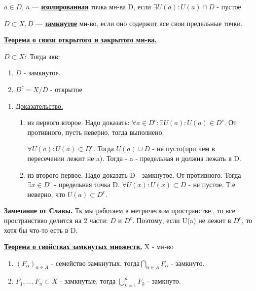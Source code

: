 \documentclass{article}
\newcommand{\deff}[1]{\underline{\textbf{#1}}}
\newcommand{\thmm}[1]{\underline{\textbf{#1}}}
\begin{document}
$a \in D$, $a$ --- \deff{изолированная} точка мн-ва D, если $\exists U(a): U(a) \cap D$ - пустое

$D \subset X, D$ --- \deff{замкнутое} мн-во, если оно содержит все свои предельные точки.

\thmm{Теорема о связи открытого и закрытого мн-ва.}

$D \subset X:$ Тогда экв:

\begin{enumerate}
    \item $D$ - замкнутое.
    \item $D^c =X/D$ - открытое
\end{enumerate}
\begin{enumerate}
        \item[] \uline{Доказательство.}

        \begin{enumerate}
            \item из первого второе. Надо доказать: $\forall a \in D^c:  \exists U(a): U(a) \in D^c$. От противного, пусть неверно, тогда выполнено:

            $\forall U(a): U(a) \subset D^c$. Тогда $U(a) \cup D$ - не пусто(при чем в пересечении лежит не a). Тогда - a - предельная и должна лежать в D.

            \item  из второго первое. Надо доказать D - замкнутое. От противного. Тогда $\exists x\in D^c$ - предельная точка D.
            $\forall U(x): U(x) \subset D$ - не пустое. Т.е неверно, что $U(a) \subset D^c$.

        \end{enumerate}

    \end{enumerate}

\textbf{Замечание от Славы.}  Тк мы работаем в метрическом пространстве., то все пространствво  делится на 2 части: $D$ и $D^c$. Поэтому, если U(a) не лежит в $D^c$, то хотя бы что-то есть в D.

\thmm{Теорема о свойствах замкнутых множеств.}
X - мн-во
\begin{enumerate}
    \item $(F_\alpha)_{\alpha \in A}$ - семейство замкнутых, тогда$\bigcap\limits_{\alpha \in A}F_\alpha$ - замкнуто.
    \item $F_1,\ldots,F_n \subset X$ - замкнутые, тогда $\bigcup\limits_{k=1}^n F_k$ - замкнуто. 
\end{enumerate}
\end{document}
